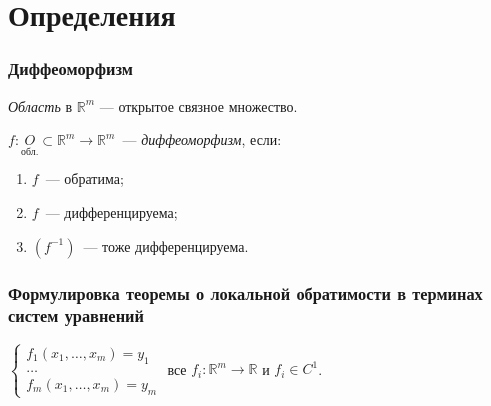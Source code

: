 \documentclass{article}
\begin{document}
\newcommand{\R}[0]{\mathbb{R}}
\newcommand{\RM}[0]{\mathbb{R}^m}
\newcommand{\dist}[0]{\mathrm{dist}}
\newcommand{\rang}[0]{\mathrm{rang} $\ $}
\newcommand{\grad}[0]{\mathrm{grad} $\ $}
\newcommand{\Lin}[0]{\mathrm{Lin} $\ $}

\tableofcontents

\newpage 

\part{Определения}

    \newpage

    \section{Диффеоморфизм}
    
        \textit{Область} в $\RM$ --- открытое связное множество.
        
        $f : \underset{\text{обл.}}{O} \subset \RM \rightarrow \RM$~--- \textit{диффеоморфизм}, если:
        
        \begin{enumerate}
        
            \item $f$~--- обратима;
            
            \item $f$~--- дифференцируема;
            
            \item $(f^{-1})$~--- тоже дифференцируема.
            
        \end{enumerate}
        
    \newpage
    
    \section{Формулировка теоремы о локальной обратимости в терминах систем уравнений}
    
    $
        \begin{cases}
            
            f_1(x_1, \ldots, x_m) = y_1 \\
                
            \ldots \\
                
            f_m(x_1, \ldots, x_m) = y_m
            
        \end{cases}
    $ все $f_i : \RM \rightarrow \R$ и $f_i \in C^1$.
        
\end{document}
